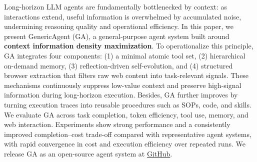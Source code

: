 Long-horizon LLM agents are fundamentally bottlenecked by context: as interactions extend, useful information is overwhelmed by accumulated noise, undermining reasoning quality and operational efficiency. 
In this paper, we present GenericAgent (GA), a general-purpose agent system built around \textbf{context information density maximization}.
To operationalize this principle, GA integrates four components: (1) a minimal atomic tool set, (2) hierarchical on-demand memory, (3) reflection-driven self-evolution, and (4) structured browser extraction that filters raw web content into task-relevant signals.
These mechanisms continuously suppress low-value context and preserve high-signal information during long-horizon execution. 
Besides, GA further improves by turning execution traces into reusable procedures such as SOPs, code, and skills. 
We evaluate GA across task completion, token efficiency, tool use, memory, and web interaction. 
Experiments show strong performance and a consistently improved completion–cost trade-off compared with representative agent systems, with rapid convergence in cost and execution efficiency over repeated runs. 
We release GA as an open-source agent system at \href{https://github.com/lsdefine/GenericAgent/}{GitHub}.



